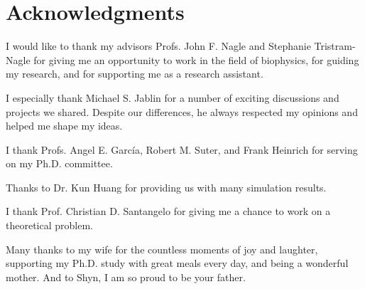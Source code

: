 \section*{Acknowledgments}

I would like to thank my advisors Profs. John F. Nagle and Stephanie
Tristram-Nagle for giving me an opportunity to work in the field of biophysics,
for guiding my research, and for supporting me as a research assistant. 

I especially thank Michael S. Jablin for a number of exciting discussions and 
projects we shared. Despite our differences, he always respected my opinions
and helped me shape my ideas.

I thank Profs. Angel E. Garc\'{i}a, Robert M. Suter, and Frank Heinrich
for serving on my Ph.D. committee.

Thanks to Dr. Kun Huang for providing us with many simulation results.

I thank Prof. Christian D. Santangelo for giving me a chance to work on 
a theoretical problem. 

Many thanks to my wife for the countless moments of joy and laughter,
supporting my Ph.D. study with great meals every day, and being a wonderful 
mother.
And to Shyn, I am so proud to be your father.
